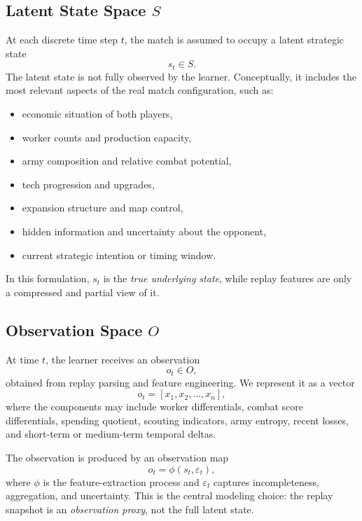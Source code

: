 \documentclass[11pt,a4paper]{article}
\begin{document}
\subsection{Latent State Space \texorpdfstring{$S$}{S}}
At each discrete time step $t$, the match is assumed to occupy a latent strategic state
\[
s_t \in S.
\]
The latent state is not fully observed by the learner. Conceptually, it includes the most relevant aspects of the real match configuration, such as:
\begin{itemize}[leftmargin=1.8em]
    \item economic situation of both players,
    \item worker counts and production capacity,
    \item army composition and relative combat potential,
    \item tech progression and upgrades,
    \item expansion structure and map control,
    \item hidden information and uncertainty about the opponent,
    \item current strategic intention or timing window.
\end{itemize}

In this formulation, $s_t$ is the \emph{true underlying state}, while replay features are only a compressed and partial view of it.

\subsection{Observation Space \texorpdfstring{$O$}{O}}
At time $t$, the learner receives an observation
\[
o_t \in O,
\]
obtained from replay parsing and feature engineering. We represent it as a vector
\[
o_t = [x_1, x_2, \dots, x_n],
\]
where the components may include worker differentials, combat score differentials, spending quotient, scouting indicators, army entropy, recent losses, and short-term or medium-term temporal deltas.

The observation is produced by an observation map
\[
o_t = \phi(s_t, \varepsilon_t),
\]
where $\phi$ is the feature-extraction process and $\varepsilon_t$ captures incompleteness, aggregation, and uncertainty. This is the central modeling choice: the replay snapshot is an \emph{observation proxy}, not the full latent state.
\end{document}
